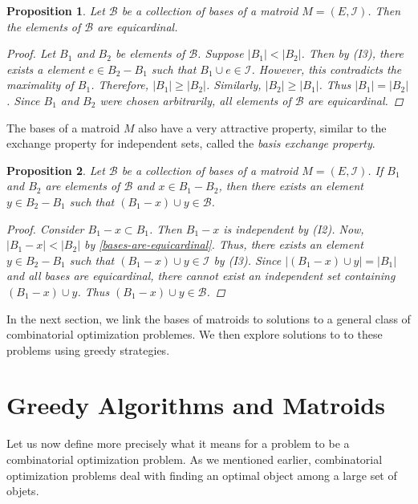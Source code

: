 \documentclass[a4paper,11pt]{report}
\theoremstyle{plain}
\newtheorem{prp}[prp]{Proposition}
\theoremstyle{definition}
\newcommand{\I}{\mathcal{I}}
\newcommand{\B}{\mathscr{B}}
\begin{document}
\begin{prp}\label{bases-are-equicardinal}
Let $\B$ be a collection of bases of a matroid $M = (E,\I)$. Then the elements
of $\B$ are equicardinal.

\begin{proof}
Let $B_1$ and $B_2$ be elements of $\B$. Suppose $|B_1| < |B_2|$. Then by
(I3), there exists a element $e \in B_2 - B_1$ such that $B_1 \cup e \in \I$.
However, this contradicts the maximality of $B_1$. Therefore,
$|B_1| \geq |B_2|$. Similarly, $|B_2| \geq |B_1|$. Thus $|B_1| = |B_2|$. Since
$B_1$ and $B_2$ were chosen arbitrarily, all elements of $\B$ are equicardinal.
\end{proof}
\end{prp}

The bases of a matroid $M$ also have a very attractive property, similar to the
exchange property for independent sets, called the
\emph{basis exchange property}.

\begin{prp}\label{basis-exchange}
Let $\B$ be a collection of bases of a matroid $M = (E,\I)$. If $B_1$ and
$B_2$ are elements of $\B$ and $x \in B_1 - B_2$, then there exists an element
$y \in B_2 - B_1$ such that $(B_1 - x) \cup y \in \B$.

\begin{proof}
Consider $B_1 - x \subset B_1$. Then $B_1 - x$ is independent by (I2). Now,
$|B_1 - x| < |B_2|$ by \autoref{bases-are-equicardinal}. Thus, there exists an
element $y \in B_2 - B_1$ such that $(B_1 - x) \cup y \in \I$ by (I3). Since
$|(B_1 - x) \cup y| = |B_1|$ and all bases are equicardinal, there cannot
exist an independent set containing $(B_1 - x) \cup y$. Thus $(B_1 - x) \cup
y \in \B$.
\end{proof}
\end{prp}


In the next section, we link the bases of matroids to solutions to a general
class of combinatorial optimization problemes. We then explore solutions to to
these problems using greedy strategies.

\section{Greedy Algorithms and Matroids}

Let us now define more precisely what it means for a problem to be a
combinatorial optimization problem. As we mentioned earlier, combinatorial
optimization problems deal with finding an optimal object among a large set of
objets.
\end{document}
